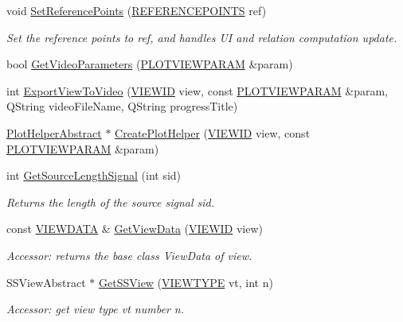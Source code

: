 \begin{CompactItemize}
void \hyperlink{class_main_window_3e233ddbde303541bd6cca204dc65a08}{SetReferencePoints} (\hyperlink{data_8h_7b296bba56ab2e0ad6167aadcafe80d2}{REFERENCEPOINTS} ref)
\begin{CompactList}\small\item\em Set the reference points to ref, and handles UI and relation computation update. \item\end{CompactList}\item 
bool \hyperlink{class_main_window_61e35778b62387271c2c6e6205edf5e6}{GetVideoParameters} (\hyperlink{struct_p_l_o_t_v_i_e_w_p_a_r_a_m}{PLOTVIEWPARAM} \&param)
\item 
int \hyperlink{class_main_window_62c631b1db13fcd6377fda76a5b18585}{ExportViewToVideo} (\hyperlink{class_v_i_e_w_i_d}{VIEWID} view, const \hyperlink{struct_p_l_o_t_v_i_e_w_p_a_r_a_m}{PLOTVIEWPARAM} \&param, QString videoFileName, QString progressTitle)
\item 
\hyperlink{class_plot_helper_abstract}{PlotHelperAbstract} $\ast$ \hyperlink{class_main_window_c20f79a0babf3630416d943e15d72c15}{CreatePlotHelper} (\hyperlink{class_v_i_e_w_i_d}{VIEWID} view, const \hyperlink{struct_p_l_o_t_v_i_e_w_p_a_r_a_m}{PLOTVIEWPARAM} \&param)
\item 
int \hyperlink{class_main_window_244cdded6367e002219f5d44bbb07953}{GetSourceLengthSignal} (int sid)
\begin{CompactList}\small\item\em Returns the length of the source signal sid. \item\end{CompactList}\item 
const \hyperlink{class_v_i_e_w_d_a_t_a}{VIEWDATA} \& \hyperlink{class_main_window_82b38907180dfd250441a53a99553ea1}{GetViewData} (\hyperlink{class_v_i_e_w_i_d}{VIEWID} view)
\begin{CompactList}\small\item\em Accessor: returns the base class ViewData of view. \item\end{CompactList}\item 
SSViewAbstract $\ast$ \hyperlink{class_main_window_d4dc49b2142db966c0409d91914f47b4}{GetSSView} (\hyperlink{data_8h_df19f45a6b4a54e345761faa6837c333}{VIEWTYPE} vt, int n)
\begin{CompactList}\small\item\em Accessor: get view type vt number n. \item\end{CompactList}\item 

\end{CompactItemize}
